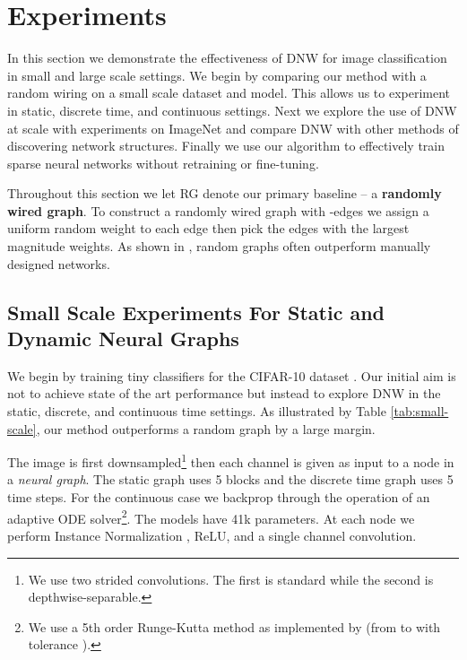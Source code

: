 \documentclass{article}
\begin{document}
\section{Experiments} \label{sec:experiments}

In this section we demonstrate the effectiveness of DNW for image classification in small and large scale settings. We begin by comparing our method with a random wiring on a small scale dataset and model. This allows us to experiment in static, discrete time, and continuous settings. Next we explore the use of DNW at scale with experiments on ImageNet \cite{imagenet} and compare DNW with other methods of discovering network structures. Finally we use our algorithm to effectively train sparse neural networks without retraining or fine-tuning. 

Throughout this section we let RG denote our primary baseline -- a \textbf{randomly wired graph}. To construct a randomly wired graph with -edges we assign a uniform random weight to each edge then pick the  edges with the largest magnitude weights. As shown in \cite{randwire}, random graphs often outperform manually designed networks.

\subsection{Small Scale Experiments For Static and Dynamic Neural Graphs} \label{sec:small-scale}
We begin by training tiny classifiers for the CIFAR-10 dataset \cite{cifar}. Our initial aim is not to achieve state of the art performance but instead to explore DNW in the static, discrete, and continuous time settings. As illustrated by Table \ref{tab:small-scale}, our method outperforms a random graph by a large margin.

The image is first downsampled\footnote{We use two  strided convolutions. The first is standard while the second is depthwise-separable.} then each channel is given as input to a node in a \textit{neural graph}. The static graph uses 5 blocks and the discrete time graph uses 5 time steps. For the continuous case we backprop through the operation of an adaptive ODE solver\footnote{We use a 5th order Runge-Kutta method \cite{ode} as implemented by \cite{node} (from  to  with tolerance ).}. The models have 41k parameters. At each node we perform Instance Normalization \cite{instancenorm}, ReLU, and a  single channel convolution.
\end{document}
